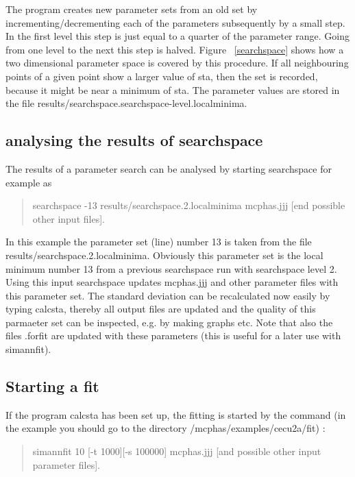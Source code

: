 The program creates new parameter sets from an old set by incrementing/decrementing
each of the parameters subsequently by a small step. In the first level this step
is just equal to a quarter of the parameter range. Going from one level to
 the next this step is halved. Figure ~\ref{searchspace} shows how a two dimensional
 parameter space is covered by this procedure. If all neighbouring points of
 a given point show a larger value of {\prg sta}, then the set is recorded, because it might be
 near a minimum of {\prg sta}. The parameter values are stored in the file
 {\prg results/searchspace.searchspace-level.localminima}.

\subsection{analysing the results of {\prg searchspace}}

The results of a parameter search can be analysed by starting searchspace for example as

\begin{quote}
{\prg searchspace -13 results/searchspace.2.localminima mcphas.jjj [end possible other input files]}.
\end{quote}

In this example the parameter set (line) number 13 is taken from the
 file {\prg results/searchspace.2.localminima}. Obviously this parameter set is the local minimum number 13
from a previous searchspace run with searchspace level 2. Using this input
 searchspace updates {\prg mcphas.jjj} and
other parameter files with this parameter set.
The standard deviation can be recalculated now easily by typing {\prg calcsta}, thereby all
output files are updated and the quality of this parmaeter set can be inspected, e.g. by
making graphs etc.
Note that also the files {\prg *.forfit} are updated with
these parameters (this is useful for a later use with {\prg simannfit}).

\subsection{Starting a fit}

If the program {\prg calcsta} has been set up, the fitting is started
by the command (in the example you should go to the directory {\prg /mcphas/examples/cecu2a/fit}) 
:

\begin{quote}
 {\prg simannfit 10 [-t 1000][-s 100000] mcphas.jjj [and possible other input parameter files]}.
\end{quote}

